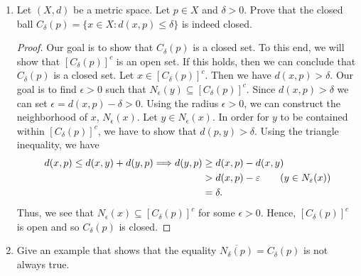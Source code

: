 \documentclass[a4paper]{article}
\begin{document}
\begin{enumerate}
\begin{enumerate}
\begin{proof}
                The last case is similar to (ii). Let \( \epsilon > 0 \). If \( x  \) is a limit point of \( (-\infty, b] \), then \( {N}_{\epsilon}(x) \cap [- \infty, b) \setminus  \{ x  \} \neq \emptyset \) implies that we can pick \( p \neq x  \) such that \( p \in [- \infty ,  b) \). Since \( \epsilon > 0 \) is arbitrary, we have
                \[  q - \epsilon < x < q + \epsilon \leq b + \epsilon \]
                implies 
                \[  q < x \leq b.  \]
                Hence, \( x \in (-\infty, b] \) and so \( (- \infty , b]  \) is a closed set.
                \end{proof}
        \end{enumerate}
    \item Let \( (X,d) \) be a metric space. Let \( p \in X   \) and \( \delta > 0  \). Prove that the closed ball \( {C}_{\delta}(p) = \{ x \in X : d(x,p) \leq \delta  \}  \) is indeed closed.
    \begin{proof}
        Our goal is to show that \( {C}_{\delta}(p) \) is a closed set. To this end, we will show that \( [{C}_{\delta}(p)]^{c} \) is an open set. If this holds, then we can conclude that \( {C}_{\delta}(p) \) is a closed set. Let \( x \in [{C}_{\delta}(p)]^{c} \). Then we have \( d(x,p) > \delta \). Our goal is to find \( \epsilon > 0  \) such that \( {N}_{\epsilon}(y) \subseteq [{C}_{\delta}(p)]^{c} \). Since \( d(x,p) > \delta \) we can set \( \epsilon = d(x,p) - \delta > 0  \). 
        Using the radius \( \epsilon > 0  \), we can construct the neighborhood of \( x  \), \( {N}_{\epsilon}(x) \). Let \( y \in {N}_{\epsilon}(x) \). In order for \( y  \) to       be contained within \( [{C}_{\delta}(p)]^{c} \), we have to show that \( d(p,y) > \delta \). Using the triangle inequality, we have 
        \begin{align*}
            d(x,p) \leq d(x,y) + d(y,p) \Longrightarrow d(y,p) &\geq d(x,p) - d(x,y) \\   
                                                               &> d(x,p) - \epsilon \tag{\( y \in {N}_{\epsilon}(x) \)} \\ 
                                                               &= \delta.
        \end{align*}
        Thus, we see that \( {N}_{\epsilon}(x) \subseteq [{C}_{\delta}(p)]^{c} \) for some \( \epsilon > 0  \). Hence, \( [{C}_{\delta}(p)]^{c} \) is open and so \( {C}_{\delta}(p) \) is closed.   
    \end{proof}
    \item Give an example that shows that the equality \( \overline{{N}_{\delta}(p)} = {C}_{\delta}(p)  \) is not always true.

\end{enumerate}
\end{document}
